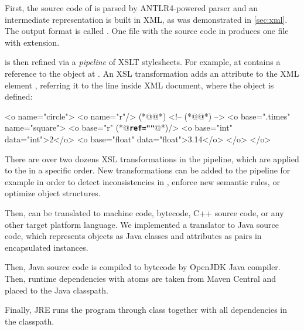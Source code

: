 First, the source code of \eolang{} is parsed by ANTLR4-powered
parser and an intermediate representation is built in XML,
as was demonstrated in \cref{sec:xml}.
The output format is called \xmir{}.
One  file with
the source code in \eolang{} produces one \xmir{} file with  extension.

\xmir{} is then refined via a \emph{pipeline} of XSLT stylesheets.
For example, \xmir{} at  contains a
reference to the object  at .
An XSL transformation adds an attribute  to the XML element ,
referring it to the line inside XML document, where the object  is defined:

\begin{ffcode}
<o name="circle">
  <o name="r"/> (*@\label{ln:xml-circle2-r}@*) <!-- (*@\texttt{}@*) -->
  <o base=".times" name="square">
    <o base="r" (*@\textbf{\texttt{ref=""}}@*)/>
    <o base="int" data="int">2</o>
    <o base="float" data="float">3.14</o>
  </o>
</o>
\end{ffcode}

There are over two dozens XSL transformations in the pipeline, which
are applied to the \xmir{} in a specific order. New transformations can
be added to the pipeline for example in order to detect inconsistencies
in \xmir{}, enforce new semantic rules, or optimize object structures.

Then, \xmir{} can be translated to machine code, bytecode, C++ source code,
or any other target platform language. We implemented
a translator to Java source code, which represents
\xmir{} objects as Java classes and attributes as pairs in encapsulated
 instances.

Then, Java source code is compiled to bytecode by OpenJDK Java compiler.
Then, runtime dependencies with atoms are taken from Maven Central
and placed to the Java classpath.

Finally, JRE runs the program through  class together with
all  dependencies in the classpath.

